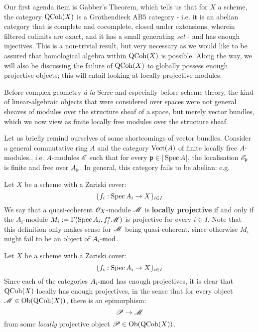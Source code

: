             Our first agenda item is Gabber's Theorem, which tells us that for $X$ a scheme, the category $\QCoh(X)$ is a Grothendieck AB5 category - i.e. it is an abelian category that is complete and cocomplete, closed under extensions, wherein filtered colimits are exact, and it has a small generating \textit{set} - and has enough injectives. This is a non-trivial result, but very necessary as we would like to be assured that homological algebra within $\QCoh(X)$ is possible. Along the way, we will also be discussing the failure of $\QCoh(X)$ to globally possess enough projective objects; this will entail looking at locally projective modules. 
            \begin{remark}
                Before complex geometry \textit{\`a la} Serre and especially before scheme theory, the kind of linear-algebraic objects that were considered over spaces were not general sheaves of modules over the structure sheaf of a space, but merely vector bundles, which we now view as finite locally free modules over the structure sheaf. 

                Let us briefly remind ourselves of some shortcomings of vector bundles. Consider a general commutative ring $A$ and the category $\Vect(A)$ of finite locally free $A$-modules., i.e. $A$-modules $\scrE$ such that for every $\p \in |\Spec A|$, the localisation $\scrE_{\p}$ is finite and free over $A_{\p}$. In general, this category fails to be abelian: e.g. 
            \end{remark}

            \begin{definition} \label{def: locally_projective_modules}
                Let $X$ be a scheme with a Zariski cover:
                    $$\{f_i: \Spec A_i \to X\}_{i \in I}$$
                We say that a quasi-coherent $\scrO_X$-module $\scrM$ is \textbf{locally projective} if and only if the $A_i$-module $M_i := \Gamma(\Spec A_i, f_i^*\scrM)$ is projective for every $i \in I$. Note that this definition only makes sense for $\scrM$ being quasi-coherent, since otherwise $M_i$ might fail to be an object of $A_i\mod$.
            \end{definition}
            \begin{remark}
                Let $X$ be a scheme with a Zariski cover:
                    $$\{f_i: \Spec A_i \to X\}_{i \in I}$$
                Since each of the categories $A_i\mod$ has enough projectives, it is clear that $\QCoh(X)$ locally has enough projectives, in the sense that for every object $\scrM \in \Ob( \QCoh(X) )$, there is an epimorphism:
                    $$\scrP \to \scrM$$
                from some \textit{locally} projective object $\scrP \in \Ob( \QCoh(X) )$. 
            \end{remark}

